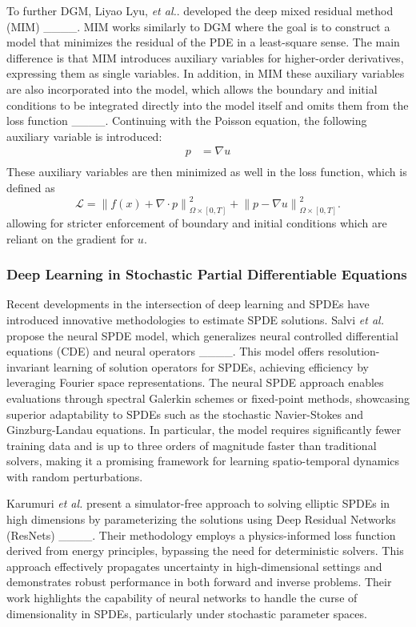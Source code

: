 To further DGM, Liyao Lyu, \textit{et al.}. developed  the deep mixed residual method (MIM) ____. MIM works similarly to DGM where the goal is to construct a model that minimizes the residual of the PDE in a least-square sense. The main difference is that MIM introduces auxiliary variables for higher-order derivatives, expressing them as single variables. In addition, in MIM these auxiliary variables are also incorporated into the model, which allows the boundary and initial conditions to be integrated directly into the model itself and omits them from the loss function ____. Continuing with the Poisson equation, the following auxiliary variable is introduced:
\begin{align*}   
    p &= \nabla u \\
\end{align*}
These auxiliary variables are then minimized as well in the loss function, which is defined as
\begin{equation*}
    \mathcal{L} = \left\| f(x) + \nabla \cdot p \right\|^2_{\Omega \times [0,T]} +\left\| p - \nabla u \right\|^2_{\Omega \times [0,T]}.
\end{equation*}
allowing for stricter enforcement of boundary and initial conditions which are reliant on the gradient for \(u\). 

\subsubsection{Deep Learning in Stochastic Partial Differentiable Equations}
Recent developments in the intersection of deep learning and SPDEs have introduced innovative methodologies to estimate SPDE solutions. Salvi \textit{et al.} propose the neural SPDE model, which generalizes neural controlled differential equations (CDE) and neural operators ____. This model offers resolution-invariant learning of solution operators for SPDEs, achieving efficiency by leveraging Fourier space representations. The neural SPDE approach enables evaluations through spectral Galerkin schemes or fixed-point methods, showcasing superior adaptability to SPDEs such as the stochastic Navier-Stokes and Ginzburg-Landau equations. In particular, the model requires significantly fewer training data and is up to three orders of magnitude faster than traditional solvers, making it a promising framework for learning spatio-temporal dynamics with random perturbations.

Karumuri \textit{et al.} present a simulator-free approach to solving elliptic SPDEs in high dimensions by parameterizing the solutions using Deep Residual Networks (ResNets) ____. Their methodology employs a physics-informed loss function derived from energy principles, bypassing the need for deterministic solvers. This approach effectively propagates uncertainty in high-dimensional settings and demonstrates robust performance in both forward and inverse problems. Their work highlights the capability of neural networks to handle the curse of dimensionality in SPDEs, particularly under stochastic parameter spaces.

